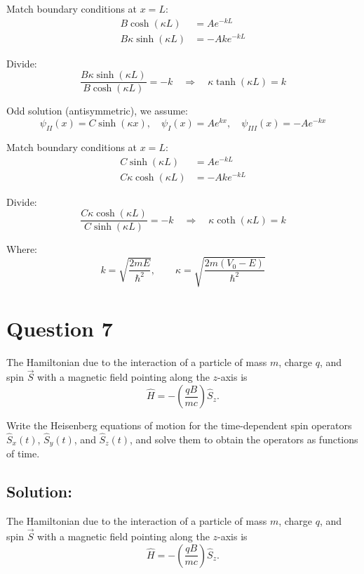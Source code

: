 \documentclass[12pt]{article}
\begin{document}
        Match boundary conditions at \( x = L \):
        \begin{align*}
            B \cosh(\kappa L) &= A e^{-k L} \\
            B \kappa \sinh(\kappa L) &= -A k e^{-k L}
        \end{align*}
        
        Divide:
        \[
            \frac{B \kappa \sinh(\kappa L)}{B \cosh(\kappa L)} = -k
            \quad \Rightarrow \quad \boxed{\kappa \tanh(\kappa L) = k}
        \]
        
        Odd solution (antisymmetric), we assume:
        \[
            \psi_{II}(x) = C \sinh(\kappa x), \quad \psi_I(x) = A e^{k x}, \quad \psi_{III}(x) = -A e^{-k x}
        \]
        
        Match boundary conditions at \( x = L \):
        \begin{align*}
            C \sinh(\kappa L) &= A e^{-k L} \\
            C \kappa \cosh(\kappa L) &= -A k e^{-k L}
        \end{align*}
        
        Divide:
        \[
            \frac{C \kappa \cosh(\kappa L)}{C \sinh(\kappa L)} = -k
            \quad \Rightarrow \quad \boxed{\kappa \coth(\kappa L) = k}
        \]

        Where:
        \[
            k = \sqrt{\frac{2mE}{\hbar^2}}, \qquad
            \kappa = \sqrt{\frac{2m(V_0 - E)}{\hbar^2}}
        \]

\section{Question 7}
    The Hamiltonian due to the interaction of a particle of mass \( m \), charge \( q \), and spin \( \vec{S} \) with a magnetic field pointing along the \( z \)-axis is
    \[
        \hat{H} = -\left( \frac{qB}{mc} \right) \hat{S}_z.
    \]
    
    Write the Heisenberg equations of motion for the time-dependent spin operators \( \hat{S}_x(t) \), \( \hat{S}_y(t) \), and \( \hat{S}_z(t) \), and solve them to obtain the operators as functions of time.

    \subsection{Solution:}
The Hamiltonian due to the interaction of a particle of mass \( m \), charge \( q \), and spin \( \vec{S} \) with a magnetic field pointing along the \( z \)-axis is
\[
\hat{H} = -\left( \frac{qB}{mc} \right) \hat{S}_z.
\]
\end{document}
